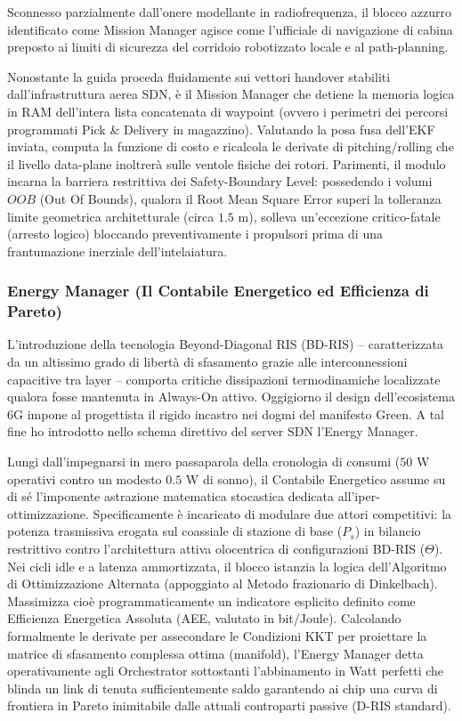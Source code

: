 \documentclass[twoside]{article}
\begin{document}
Sconnesso parzialmente dall'onere modellante in radiofrequenza, il blocco azzurro identificato come Mission Manager agisce come l'ufficiale di navigazione di cabina preposto ai limiti di sicurezza del corridoio robotizzato locale e al path-planning.

Nonostante la guida proceda fluidamente sui vettori handover stabiliti dall'infrastruttura aerea SDN, è il Mission Manager che detiene la memoria logica in RAM dell'intera lista concatenata di waypoint (ovvero i perimetri dei percorsi programmati Pick \& Delivery in magazzino). Valutando la posa fusa dell'EKF inviata, computa la funzione di costo e ricalcola le derivate di pitching/rolling che il livello data-plane inoltrerà sulle ventole fisiche dei rotori. Parimenti, il modulo incarna la barriera restrittiva dei Safety-Boundary Level: possedendo i volumi $OOB$ (Out Of Bounds), qualora il Root Mean Square Error superi la tolleranza limite geometrica architetturale (circa $1.5$ m), solleva un'eccezione critico-fatale (arresto logico) bloccando preventivamente i propulsori prima di una frantumazione inerziale dell'intelaiatura.

\subsubsection{Energy Manager (Il Contabile Energetico ed Efficienza di Pareto)}

L'introduzione della tecnologia Beyond-Diagonal RIS (BD-RIS) -- caratterizzata da un altissimo grado di libertà di sfasamento grazie alle interconnessioni capacitive tra layer -- comporta critiche dissipazioni termodinamiche localizzate qualora fosse mantenuta in Always-On attivo. Oggigiorno il design dell'ecosistema 6G impone al progettista il rigido incastro nei dogmi del manifesto Green. A tal fine ho introdotto nello schema direttivo del server SDN l'Energy Manager.

Lungi dall'impegnarsi in mero passaparola della cronologia di consumi ($50$ W operativi contro un modesto $0.5$ W di sonno), il Contabile Energetico assume su di sé l'imponente astrazione matematica stocastica dedicata all'iper-ottimizzazione. Specificamente è incaricato di modulare due attori competitivi: la potenza trasmissiva erogata sul coassiale di stazione di base ($P_s$) in bilancio restrittivo contro l'architettura attiva olocentrica di configurazioni BD-RIS ($\Theta$). Nei cicli idle e a latenza ammortizzata, il blocco istanzia la logica dell'Algoritmo di Ottimizzazione Alternata (appoggiato al Metodo frazionario di Dinkelbach). Massimizza cioè programmaticamente un indicatore esplicito definito come Efficienza Energetica Assoluta (AEE, valutato in bit/Joule). Calcolando formalmente le derivate per assecondare le Condizioni KKT per proiettare la matrice di sfasamento complessa ottima (manifold), l'Energy Manager detta operativamente agli Orchestrator sottostanti l'abbinamento in Watt perfetti che blinda un link di tenuta sufficientemente saldo garantendo ai chip una curva di frontiera in Pareto inimitabile dalle attuali controparti passive (D-RIS standard).
\end{document}
